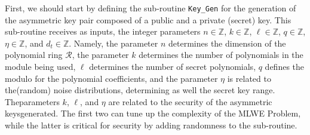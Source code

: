 \documentclass[runningheads]{llncs}
\numberwithin{equation}{section}
\begin{document}
    First, we should start by defining the sub-routine \texttt{Key\_Gen} for the generation of the asymmetric key pair composed of a public and a private (secret) key. This sub-routine receives as inputs, the integer parameters $n \in \mathbb{Z}$, $k \in \mathbb{Z}$, $\ell \in \mathbb{Z}$, $q \in \mathbb{Z}$, $\eta \in \mathbb{Z}$, and ${d}_{t} \in \mathbb{Z}$. Namely, the parameter $n$ determines the dimension of the polynomial ring $\mathcal{R}$, the parameter $k$ determines the number of polynomials in the module being used, $\ell$ determines the number of secret polynomials, $q$ defines the modulo for the polynomial coefficients, and the parameter $\eta$ is related to the\break (random) noise distributions, determining as well the secret key range. The\break parameters $k$, $\ell$, and $\eta$ are related to the security of the asymmetric keys\break generated. The first two can tune up the complexity of the MLWE Problem, while the latter is critical for security by adding randomness to the sub-routine.

    \vspace{2ex}
\end{document}
